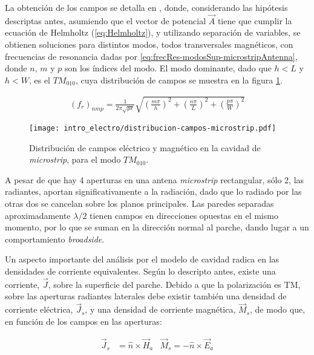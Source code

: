La obtención de los campos se detalla en \cite{Balanis:Advanced}, donde, considerando las hipótesis descriptas antes, asumiendo que el vector de potencial $\vec{A}$ tiene que cumplir la ecuación de Helmholtz (\ref{eq:Helmholtz}), y utilizando separación de variables, se obtienen soluciones para distintos modos, todos transversales magnéticos, con frecuencias de resonancia dadas por \ref{eq:frecRes-modosSup-microstripAntenna}, donde $n$, $m$ y $p$ son los índices del modo. El modo dominante, dado que $h < L$ y $h < W$, es el $TM_{010}$, cuya distribución de campos se muestra en la figura \ref{fig:distribucion-campos-microstrip}.
 
\begin{align}
	(f_r)_{nmp} = \frac{1}{2 \pi \sqrt{\mu \epsilon}} \sqrt{\left(\frac{m\pi}{h}\right)^2 + \left(\frac{n\pi}{L}\right)^2 + \left(\frac{p\pi}{W}\right)^2}
	\label{eq:frecRes-modosSup-microstripAntenna}
\end{align}

\begin{figure}[htp]
	\centering
	\texttt{[image: intro\_electro/distribucion-campos-microstrip.pdf]}
	\caption{Distribución de campos eléctrico y magnético en la cavidad de \textit{microstrip}, para el modo $TM_{010}$.}
	\label{fig:distribucion-campos-microstrip}
\end{figure}

A pesar de que hay 4 aperturas en una antena \textit{microstrip} rectangular, sólo 2, las radiantes, aportan significativamente a la radiación, dado que lo radiado por las otras dos se cancelan sobre los planos principales. Las paredes separadas aproximadamente $\lambda/2$ tienen campos en direcciones opuestas en el mismo momento, por lo que se suman en la dirección normal al parche, dando lugar a un comportamiento \textit{broadside}.

Un aspecto importante del análisis por el modelo de cavidad radica en las densidades de corriente equivalentes. Según lo descripto antes, existe una corriente, $\vec{J}$, sobre la superficie del parche. Debido a que la polarización es TM, sobre las aperturas radiantes laterales debe existir también una densidad de corriente eléctrica, $\vec{J}_s$, y una densidad de corriente magnética, $\vec{M}_s$, de modo que, en función de los campos en las aperturas:

\begin{align}
	\vec{J}_s &= \hat{n} \times \vec{H}_a & \vec{M}_s = - \hat{n} \times \vec{E}_a
\end{align}

